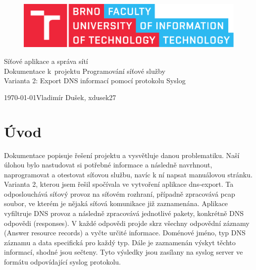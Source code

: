 \documentclass[11pt, a4paper, titlepage]{article}
\begin{document}
\begin{titlepage}
	\begin{center}
		\begin{figure}[htb]
			\centering
			\includegraphics[width=0.85\hsize]{fitlogo.pdf}
		\end{figure}
		{\Huge Síťové aplikace a správa sítí} \\
		\bigskip
		{\LARGE Dokumentace k~projektu Programování síťové služby} \\
		\bigskip
		{\Large Varianta 2: Export DNS informací pomocí protokolu Syslog}
	\end{center}
	{\Large \today \hfill Vladimír Dušek, xdusek27}
\end{titlepage}


\tableofcontents
\newpage


\section{Úvod}

Dokumentace popisuje řešení projektu a vysvětluje danou problematiku. Naší úlohou bylo nastudovat si potřebné informace a následně navrhnout, naprogramovat a otestovat síťovou službu, navíc k ní napsat manuálovou stránku. Varianta 2, kterou jsem řešil spočívala ve vytvoření aplikace dns-export. Ta odposlouchává síťový provoz na síťovém rozhraní, případně zpracovává pcap soubor, ve kterém je nějaká síťová komunikace již zaznamenána. Aplikace vyfiltruje DNS provoz a následně zpracovává jednotlivé pakety, konkrétně DNS odpovědi (responses). V každé odpovědi projde skrz všechny odpovědní záznamy (Answer resource records) a vyčte určité informace. Doménové jméno, typ DNS záznamu a data specifická pro každý typ. Dále je zaznamenán výskyt těchto informací, shodné jsou sečteny. Tyto výsledky jsou zasílany na syslog server ve formátu odpovídající syslog protokolu.
\end{document}
